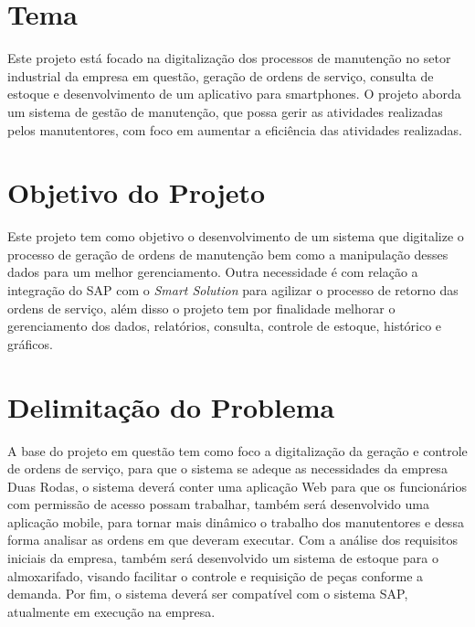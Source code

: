 \section{Tema}
Este projeto está focado na digitalização dos processos de manutenção no setor industrial da empresa em questão, geração de ordens de serviço, consulta de estoque e desenvolvimento de um aplicativo para smartphones. O projeto aborda um sistema de gestão de manutenção, que possa gerir as atividades realizadas pelos manutentores, com foco em aumentar a eficiência das atividades realizadas.
\section{Objetivo do Projeto}
Este projeto tem como objetivo o desenvolvimento de um sistema que digitalize o processo de geração de ordens de manutenção bem como a manipulação desses dados para um melhor gerenciamento. Outra necessidade é com relação a integração do SAP com o \textit{Smart Solution} para agilizar o processo de retorno das ordens de serviço, além disso o projeto tem por finalidade melhorar o gerenciamento dos dados, relatórios, consulta, controle de estoque, histórico e gráficos.
\section{Delimitação do Problema}

A base do projeto em questão tem como foco a digitalização da geração e controle de ordens de serviço, para que o sistema se adeque as necessidades da empresa Duas Rodas, o sistema deverá conter uma aplicação Web para que os funcionários com permissão de acesso possam trabalhar, também será desenvolvido uma aplicação mobile, para tornar mais dinâmico o trabalho dos manutentores e dessa forma analisar as ordens em que deveram executar.
Com a análise dos requisitos iniciais da empresa, também será desenvolvido um sistema de estoque para o almoxarifado, visando facilitar o controle e requisição de peças conforme a demanda. Por fim, o sistema deverá ser compatível com o sistema SAP, atualmente em execução na empresa.


